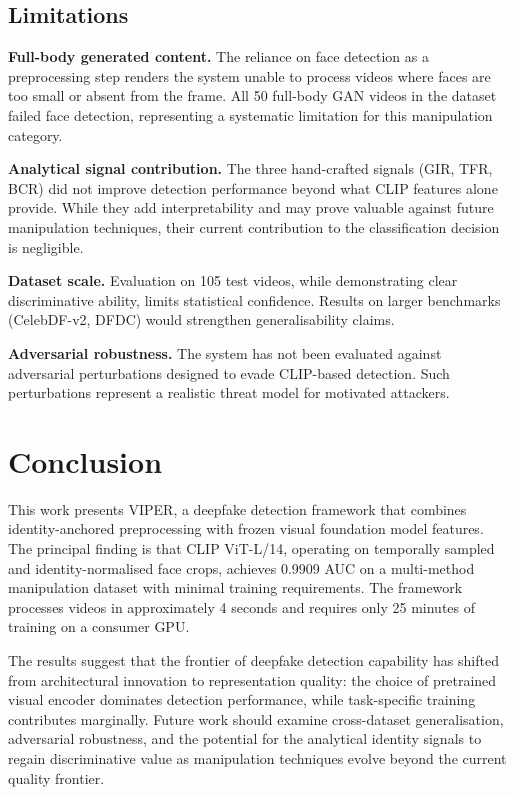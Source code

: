 \documentclass[11pt, twocolumn]{article}
\begin{document}
\subsection{Limitations}

\textbf{Full-body generated content.} The reliance on face detection as a preprocessing step renders the system unable to process videos where faces are too small or absent from the frame. All 50 full-body GAN videos in the dataset failed face detection, representing a systematic limitation for this manipulation category.

\textbf{Analytical signal contribution.} The three hand-crafted signals (GIR, TFR, BCR) did not improve detection performance beyond what CLIP features alone provide. While they add interpretability and may prove valuable against future manipulation techniques, their current contribution to the classification decision is negligible.

\textbf{Dataset scale.} Evaluation on 105 test videos, while demonstrating clear discriminative ability, limits statistical confidence. Results on larger benchmarks (CelebDF-v2, DFDC) would strengthen generalisability claims.

\textbf{Adversarial robustness.} The system has not been evaluated against adversarial perturbations designed to evade CLIP-based detection. Such perturbations represent a realistic threat model for motivated attackers.

\section{Conclusion}

This work presents VIPER, a deepfake detection framework that combines identity-anchored preprocessing with frozen visual foundation model features. The principal finding is that CLIP ViT-L/14, operating on temporally sampled and identity-normalised face crops, achieves 0.9909 AUC on a multi-method manipulation dataset with minimal training requirements. The framework processes videos in approximately 4 seconds and requires only 25 minutes of training on a consumer GPU.

The results suggest that the frontier of deepfake detection capability has shifted from architectural innovation to representation quality: the choice of pretrained visual encoder dominates detection performance, while task-specific training contributes marginally. Future work should examine cross-dataset generalisation, adversarial robustness, and the potential for the analytical identity signals to regain discriminative value as manipulation techniques evolve beyond the current quality frontier.
\end{document}
